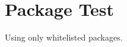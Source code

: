 \documentclass{article}
\begin{document}
\section{Package Test}
Using only whitelisted packages.
\end{document}
